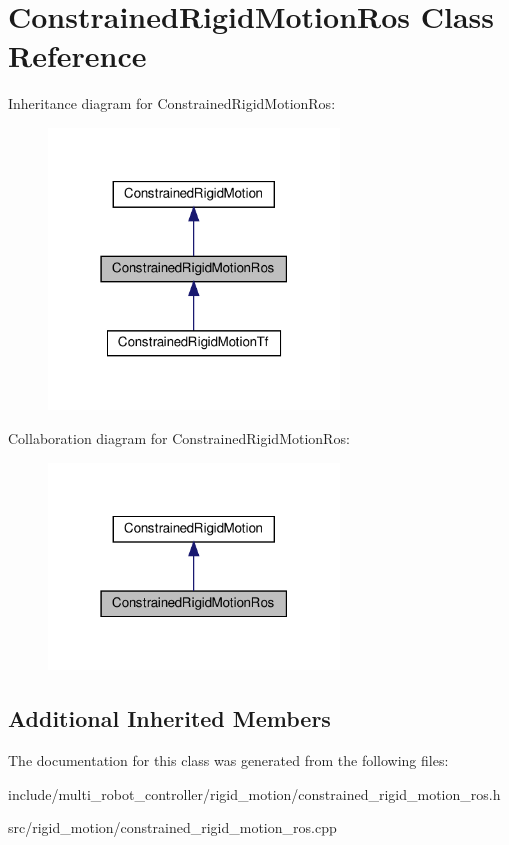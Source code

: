 \hypertarget{classConstrainedRigidMotionRos}{}\section{Constrained\+Rigid\+Motion\+Ros Class Reference}
\label{classConstrainedRigidMotionRos}


Inheritance diagram for Constrained\+Rigid\+Motion\+Ros\+:\nopagebreak
\begin{figure}[H]
\begin{center}
\leavevmode
\includegraphics[width=219pt]{d4/d50/classConstrainedRigidMotionRos__inherit__graph}
\end{center}
\end{figure}


Collaboration diagram for Constrained\+Rigid\+Motion\+Ros\+:\nopagebreak
\begin{figure}[H]
\begin{center}
\leavevmode
\includegraphics[width=219pt]{df/dc6/classConstrainedRigidMotionRos__coll__graph}
\end{center}
\end{figure}
\subsection*{Additional Inherited Members}


The documentation for this class was generated from the following files\+:\begin{DoxyCompactItemize}
\item 
include/multi\+\_\+robot\+\_\+controller/rigid\+\_\+motion/constrained\+\_\+rigid\+\_\+motion\+\_\+ros.\+h\item 
src/rigid\+\_\+motion/constrained\+\_\+rigid\+\_\+motion\+\_\+ros.\+cpp\end{DoxyCompactItemize}
